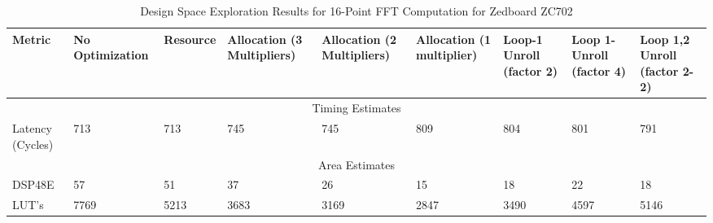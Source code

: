 \begin{table}[H]
\centering
\caption{Design Space Exploration Results for 16-Point FFT Computation for Zedboard ZC702}
\label{16-point}
\begin{tabular}{||m{1.5cm}|m{1.5cm}|m{1.5cm}|m{1.6cm}|m{1.6cm}|m{1.6cm}|m{1.4cm}|m{1.4cm}|m{1.4cm}||}
\hline
Metric & No Optimization & Resource & Allocation (3 Multipliers) & Allocation (2 Multipliers) & Allocation (1 multiplier) & Loop-1 Unroll (factor 2) & Loop 1-Unroll (factor 4) & Loop 1,2 Unroll (factor 2-2) \\
\hline
\multicolumn{9}{||c||}{Timing Estimates}\\
\hline
Latency (Cycles) & 713 &713 &745 &745 & 809 & 804 & 801 & 791\\
\hline
\multicolumn{9}{||c||}{Area Estimates}\\
\hline
DSP48E  & 57 & 51 &37 & 26 &  15 & 18 & 22 & 18\\
\hline
LUT's  &7769 & 5213 & 3683 & 3169 & 2847 & 3490 & 4597 & 5146\\
\hline
\end{tabular}

\end{table}